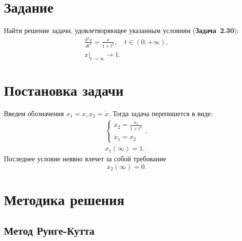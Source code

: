\documentclass[a4paper,12pt]{article}
\newcommand{\UpdateMe}[1]{\textcolor{red}{#1}}
\newcommand{\University}{Московский государственный университет имени М.~В.~Ломоносова}
\newcommand{\Department}{Кафедра \UpdateMe{НАЗВАНИЕ-КАФЕДРЫ}}
\newcommand{\Student}{\UpdateMe{ИМЯ-СТУДЕНТА}}
\newcommand{\GroupNum}{\UpdateMe{НОМЕР}}
\newcommand{\Seminar}{\UpdateMe{НАЗВАНИЕ-ПРАКТИКУМА}}
\begin{document}

\section*{Задание}
Найти решение задачи, удовлетворяющее указанным условиям ({\bfseries Задача~2.30}):
\begin{gather*}
  \frac{d^2x}{dt^2}=\frac{x}{1+t^4}, \quad t\in(0, +\infty),\\
  \left.x\right\vert_{t\to\infty}\to1.
\end{gather*}

\section*{Постановка задачи}

Введем обозначения \(x_1 = x, x_2=\dot{x}\). Тогда задача перепишется в виде:
\begin{gather}
  \label{common_system} \begin{cases}\dot{x}_2=\frac{x_1}{1+t^4}\\ \dot{x}_1=x_2 \end{cases},\\
  \label{exp_right_condition} x_1(\infty)=1.
\end{gather}
Последнее условие неявно влечет за собой требование
\begin{equation}
  \label{imp_right_condition} x_2(\infty)=0.
\end{equation}
\section*{Методика решения}

\subsection*{Метод Рунге-Кутта}
\end{document}
